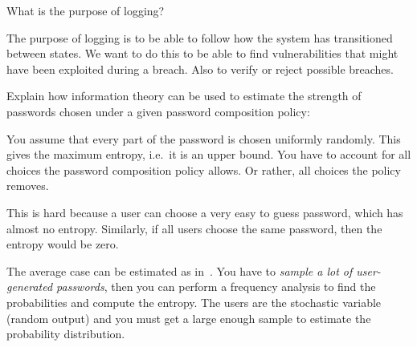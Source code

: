 \documentclass[svv,addpoints]{miunexam}
\begin{document}
\begin{questions}
\question[2]\label{q:accountability}
What is the purpose of logging?

\begin{solution}
  The purpose of logging is to be able to follow how the system has 
  transitioned between states.
  We want to do this to be able to find vulnerabilities that might have been 
  exploited during a breach.
  Also to verify or reject possible breaches.
\end{solution}


 
\question\label{q:infotheory:passwd:E:C}
  Explain how information theory can be used to estimate the strength of 
  passwords chosen under a given password composition policy:

  \begin{solution}
    You assume that every part of the password is chosen uniformly randomly.
    This gives the maximum entropy, i.e.~it is an upper bound.
    You have to account for all choices the password composition policy allows.
    Or rather, all choices the policy removes.

    This is hard because a user can choose a very easy to guess password, which 
    has almost no entropy.
    Similarly, if all users choose the same password, then the entropy would be 
    zero.

    The average case can be estimated as in~\cite{Komanduri2011opa}.
    You have to \emph{sample a lot of user-generated passwords}, then you can 
    perform a frequency analysis to find the probabilities and compute the 
    entropy.
    The users are the stochastic variable (random output) and you must get 
    a large enough sample to estimate the probability distribution.
  \end{solution}



\end{questions}
\end{document}
